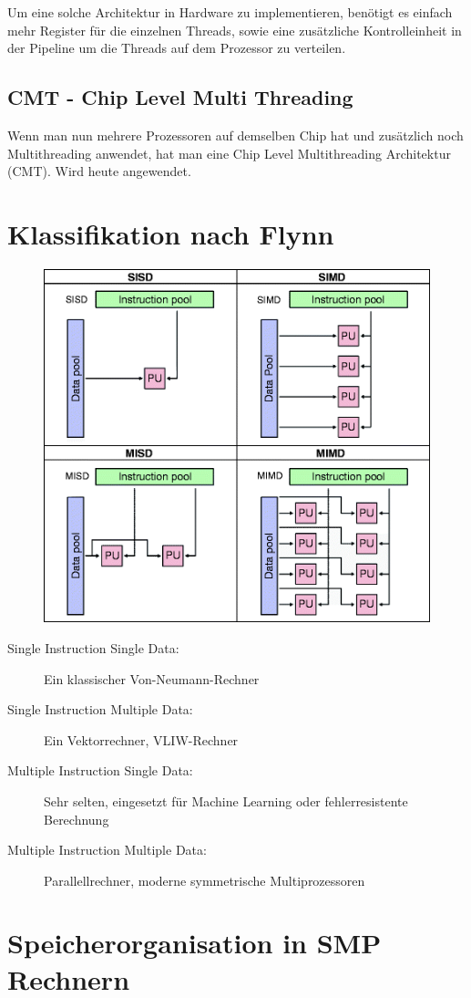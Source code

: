 Um eine solche Architektur in Hardware zu implementieren, benötigt es einfach mehr Register für die einzelnen Threads, sowie eine zusätzliche Kontrolleinheit in der Pipeline um die Threads auf dem Prozessor zu verteilen.

\subsection{CMT - Chip Level Multi Threading}
Wenn man nun mehrere Prozessoren auf demselben Chip hat und zusätzlich noch Multithreading anwendet, hat man eine Chip Level Multithreading Architektur (CMT). Wird heute angewendet.

\section{Klassifikation nach Flynn}
\begin{figure}
\centering
\includegraphics[width=0.5\linewidth]{fig/flynn}
\caption{}
\label{fig:flynn}
\end{figure}
\begin{description}
	\item[Single Instruction Single Data:] Ein klassischer Von-Neumann-Rechner
	\item[Single Instruction Multiple Data:] Ein Vektorrechner, VLIW-Rechner
	\item[Multiple Instruction Single Data:]	Sehr selten, eingesetzt für Machine Learning oder fehlerresistente Berechnung
	\item[Multiple Instruction Multiple Data:] Parallellrechner, moderne symmetrische Multiprozessoren
\end{description}

\newpage

\section{Speicherorganisation in SMP Rechnern}

